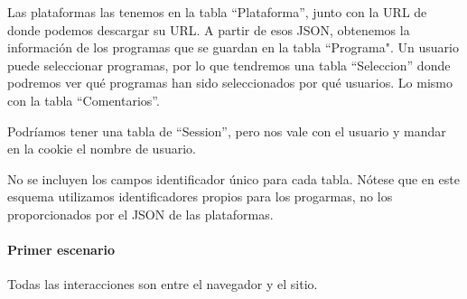 Las plataformas las tenemos en la tabla ``Plataforma'', junto con la URL de donde podemos descargar su URL. A partir de esos JSON, obtenemos la información de los programas que se guardan en la tabla ``Programa". Un usuario puede seleccionar programas, por lo que tendremos una tabla ``Seleccion'' donde podremos ver qué programas han sido seleccionados por qué usuarios. Lo mismo con la tabla ``Comentarios''.

Podríamos tener una tabla de ``Session'', pero nos vale con el usuario y mandar en la cookie el nombre de usuario.

No se incluyen los campos identificador único para cada tabla. Nótese que en este esquema utilizamos identificadores propios para los progarmas, no los proporcionados por el JSON de las plataformas.

\paragraph{Primer escenario}

Todas las interacciones son entre el navegador y el sitio.

